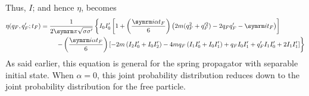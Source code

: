 Thus, $I$; and hence $\eta$, becomes
\begin{equation}
    \eta(q_F, q_F'; t_F) = \begin{multlined}[t]
        \frac{1}{2\cpi\sqrt{\sigma\sigma'}}\left\{I_0I_0'\left[1 + \left(\frac{\im\alpha t_F}{6}\right)\left(2m(q_F^2 + q_F'^2) - 2q_Fq_F' - \im t_F\right)\right] \right. \\ \left.
        - \left(\frac{\im\alpha t_F}{6}\right) \left[-2m\left(I_2I_0' + I_0I_2'\right) - 4mq_F\left(I_1I_0' + I_0I_1'\right) + q_FI_0I_1' + q_F'I_1I_0' + 2I_1I_1' \right] \right\}
    \end{multlined}
\end{equation}
As said earlier, this equation is general for the spring propagator with separable initial state. When $\alpha = 0$, this joint probability distribution reduces down to the joint probability distribution for the free particle.

